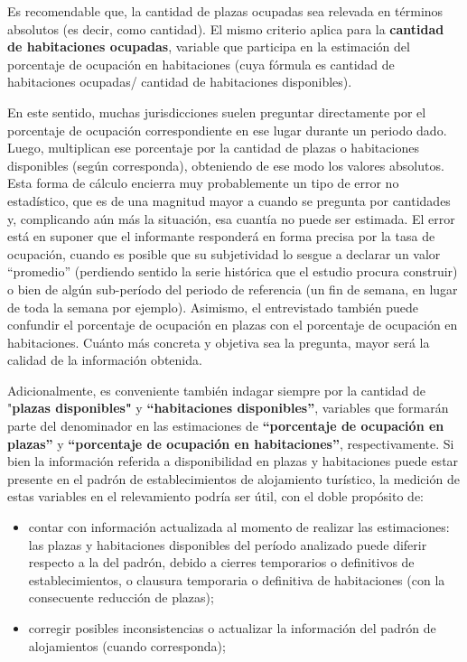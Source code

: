 \documentclass[
]{book}
\begin{document}
Es recomendable que, la cantidad de plazas ocupadas sea relevada en términos absolutos (es decir, como cantidad). El mismo criterio aplica para la \textbf{cantidad de habitaciones ocupadas}, variable que participa en la estimación del porcentaje de ocupación en habitaciones (cuya fórmula es cantidad de habitaciones ocupadas/ cantidad de habitaciones disponibles).

En este sentido, muchas jurisdicciones suelen preguntar directamente por el porcentaje de ocupación correspondiente en ese lugar durante un periodo dado. Luego, multiplican ese porcentaje por la cantidad de plazas o habitaciones disponibles (según corresponda), obteniendo de ese modo los valores absolutos. Esta forma de cálculo encierra muy probablemente un tipo de error no estadístico, que es de una magnitud mayor a cuando se pregunta por cantidades y, complicando aún más la situación, esa cuantía no puede ser estimada. El error está en suponer que el informante responderá en forma precisa por la tasa de ocupación, cuando es posible que su subjetividad lo sesgue a declarar un valor ``promedio'' (perdiendo sentido la serie histórica que el estudio procura construir) o bien de algún sub-período del periodo de referencia (un fin de semana, en lugar de toda la semana por ejemplo). Asimismo, el entrevistado también puede confundir el porcentaje de ocupación en plazas con el porcentaje de ocupación en habitaciones. Cuánto más concreta y objetiva sea la pregunta, mayor será la calidad de la información obtenida.

Adicionalmente, es conveniente también indagar siempre por la cantidad de "\textbf{plazas disponibles"} y \textbf{``habitaciones disponibles''}, variables que formarán parte del denominador en las estimaciones de \textbf{``porcentaje de ocupación en plazas''} y \textbf{``porcentaje de ocupación en habitaciones''}, respectivamente. Si bien la información referida a disponibilidad en plazas y habitaciones puede estar presente en el padrón de establecimientos de alojamiento turístico, la medición de estas variables en el relevamiento podría ser útil, con el doble propósito de:

\begin{itemize}
\item
  contar con información actualizada al momento de realizar las estimaciones: las plazas y habitaciones disponibles del período analizado puede diferir respecto a la del padrón, debido a cierres temporarios o definitivos de establecimientos, o clausura temporaria o definitiva de habitaciones (con la consecuente reducción de plazas);
\item
  corregir posibles inconsistencias o actualizar la información del padrón de alojamientos (cuando corresponda);
\end{itemize}
\end{document}
